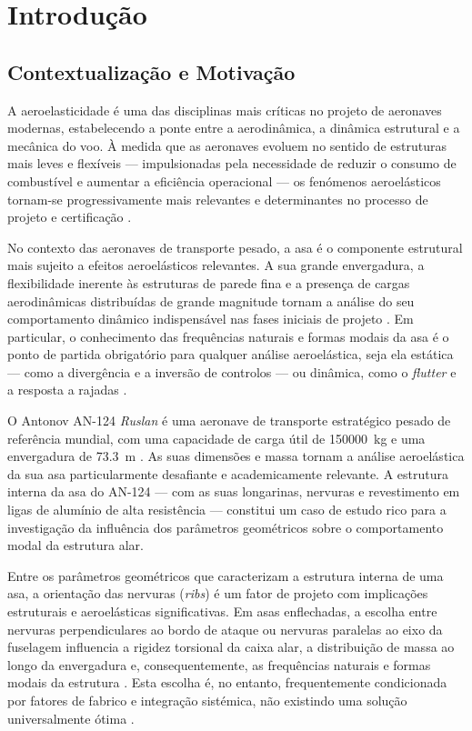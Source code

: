 \documentclass[a4paper,fleqn]{cas-sc}
\begin{document}
\section{Introdução}
\label{chap:introducao}

\subsection{Contextualização e Motivação}

A aeroelasticidade é uma das disciplinas mais críticas no projeto de aeronaves modernas, estabelecendo a ponte entre a aerodinâmica, a dinâmica estrutural e a mecânica do voo. À medida que as aeronaves evoluem no sentido de estruturas mais leves e flexíveis --- impulsionadas pela necessidade de reduzir o consumo de combustível e aumentar a eficiência operacional --- os fenómenos aeroelásticos tornam-se progressivamente mais relevantes e determinantes no processo de projeto e certificação \cite{Wright2015, Dowell2004}.

No contexto das aeronaves de transporte pesado, a asa é o componente estrutural mais sujeito a efeitos aeroelásticos relevantes. A sua grande envergadura, a flexibilidade inerente às estruturas de parede fina e a presença de cargas aerodinâmicas distribuídas de grande magnitude tornam a análise do seu comportamento dinâmico indispensável nas fases iniciais de projeto \cite{Megson2012, Bisplinghoff1996}. Em particular, o conhecimento das frequências naturais e formas modais da asa é o ponto de partida obrigatório para qualquer análise aeroelástica, seja ela estática --- como a divergência e a inversão de controlos --- ou dinâmica, como o \textit{flutter} e a resposta a rajadas \cite{Collar1946, Fung1993}.

O Antonov AN-124 \textit{Ruslan} é uma aeronave de transporte estratégico pesado de referência mundial, com uma capacidade de carga útil de \SI{150000}{\kilo\gram} e uma envergadura de \SI{73.3}{\meter} \cite{Gordon2008}. As suas dimensões e massa tornam a análise aeroelástica da sua asa particularmente desafiante e academicamente relevante. A estrutura interna da asa do AN-124 --- com as suas longarinas, nervuras e revestimento em ligas de alumínio de alta resistência --- constitui um caso de estudo rico para a investigação da influência dos parâmetros geométricos sobre o comportamento modal da estrutura alar.

Entre os parâmetros geométricos que caracterizam a estrutura interna de uma asa, a orientação das nervuras (\textit{ribs}) é um fator de projeto com implicações estruturais e aeroelásticas significativas. Em asas enflechadas, a escolha entre nervuras perpendiculares ao bordo de ataque ou nervuras paralelas ao eixo da fuselagem influencia a rigidez torsional da caixa alar, a distribuição de massa ao longo da envergadura e, consequentemente, as frequências naturais e formas modais da estrutura \cite{Niu1988, Megson2012}. Esta escolha é, no entanto, frequentemente condicionada por fatores de fabrico e integração sistémica, não existindo uma solução universalmente ótima \cite{Raymer2018}.
\end{document}
